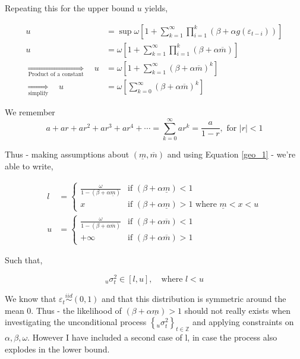 \documentclass{EconHomework}
\begin{document}
Repeating this for the upper bound $u$ yields,

\begin{align*}
    u&=\sup\omega\left[1+\sum_{k=1}^{\infty}\prod_{i=1}^{k}\left(\beta+\alpha g\left(\varepsilon_{t-i}\right)\right)\right]\\
    u&=\omega\left[1+\sum_{k=1}^{\infty}\prod_{i=1}^{k}\left(\beta+\alpha\overline{m}\right)\right]\\
    \underset{\text{Product of a constant}}{\Longrightarrow}\quad u&=\omega\left[1+\sum_{k=1}^{\infty}\left(\beta+\alpha\overline{m}\right)^{k}\right]\\
    \underset{\text{simplify}}{\Longrightarrow}\quad u&=\omega\left[\sum_{k=0}^{\infty}\left(\beta+\alpha\overline{m}\right)^{k}\right]
\end{align*}

We remember
\begin{equation*}
    a+ar+ar^{2}+ar^{3}+ar^{4}+\cdots=\sum_{k=0}^{\infty}ar^{k}=\frac{a}{1-r},\text{ for }|r|<1\tag{Geo 1}
    \label{geo_1}
\end{equation*}

Thus - making assumptions about $(\underline{m}, \overline{m})$ and using Equation \ref{geo_1} - we're able to write,

\begin{align*}
    l&=\begin{cases}
    \frac{\omega}{1-\left(\beta+\alpha\underline{m}\right)} & \text{if }\left(\beta+\alpha\underline{m}\right)<1\\
    x & \text{if }\left(\beta+\alpha\underline{m}\right)>1\text{ where }\underline{m}<x<u
    \end{cases}\\u&=\begin{cases}
    \frac{\omega}{1-\left(\beta+\alpha\overline{m}\right)} & \text{if }\left(\beta+\alpha\overline{m}\right)<1\\
    +\infty & \text{if }\left(\beta+\alpha\overline{m}\right)>1
    \end{cases}
\end{align*}

Such that,

\begin{equation*}
    _{u}\sigma_{t}^{2}\in\left[l,u\right],\quad \text{where } l<u
\end{equation*}

We know that $\varepsilon_{t} \stackrel{i i d}{\sim}(0,1)$ and that this distribution is symmetric around the mean $0$. Thus - the likelihood of $\left(\beta+\alpha\underline{m}\right)>1$ should not really exists when investigating the unconditional process $\left\{{ }_{u} \sigma_{t}^{2}\right\}_{t \in \mathbb{Z}}$ and applying constraints on $\alpha,\beta,\omega$. However I have included a second case of l, in case the process also explodes in the lower bound.
\end{document}
